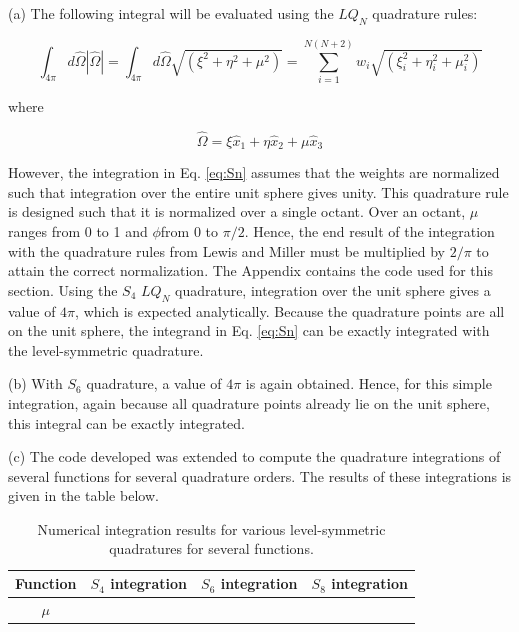 \documentclass[10pt]{article}
\newcommand*\circled[1]{\tikz[baseline=(char.base)]{
            \node[shape=circle,draw,inner sep=2pt] (char) {#1};}}
\begin{document}
\circled{2} (a) The following integral will be evaluated using the \(LQ_N\) quadrature rules:

\begin{equation}
\label{eq:Sn}
\int_{4\pi}^{}d\hat{\Omega}|\hat{\Omega}|=\int_{4\pi}^{}d\hat{\Omega}\sqrt{(\xi^2+\eta^2+\mu^2)}=\sum_{i=1}^{N(N+2)}w_i\sqrt{(\xi_i^2+\eta_i^2+\mu_i^2)}
\end{equation}

where

\begin{equation}
\hat{\Omega}=\xi\hat{x}_1+\eta\hat{x}_2+\mu\hat{x}_3
\end{equation}

However, the integration in Eq. \eqref{eq:Sn} assumes that the weights are normalized such that integration over the entire unit sphere gives unity. This quadrature rule is designed such that it is normalized over a single octant. Over an octant, \(\mu\) ranges from 0 to 1 and \(\phi\)from 0 to \(\pi/2\). Hence, the end result of the integration with the quadrature rules from Lewis and Miller must be multiplied by \(2/\pi\) to attain the correct normalization. The Appendix contains the code used for this section. Using the \(S_4\) \(LQ_N\) quadrature, integration over the unit sphere gives a value of \(4\pi\), which is expected analytically. Because the quadrature points are all on the unit sphere, the integrand in Eq. \eqref{eq:Sn} can be exactly integrated with the level-symmetric quadrature.\newline

(b) With \(S_6\) quadrature, a value of \(4\pi\) is again obtained. Hence, for this simple integration, again because all quadrature points already lie on the unit sphere, this integral can be exactly integrated.\newline

(c) The code developed was extended to compute the quadrature integrations of several functions for several quadrature orders. The results of these integrations is given in the table below.

\begin{table}[H]
\caption{Numerical integration results for various level-symmetric quadratures for several functions.}
\centering
\begin{tabular}{c c c c}
\hline\hline
Function & \(S_4\) integration & \(S_6\) integration & \(S_8\) integration\\ [0.5ex]
\hline
\(\mu\) & \\
\hline
\end{tabular}
\label{table:3}
\end{table}
\end{document}
